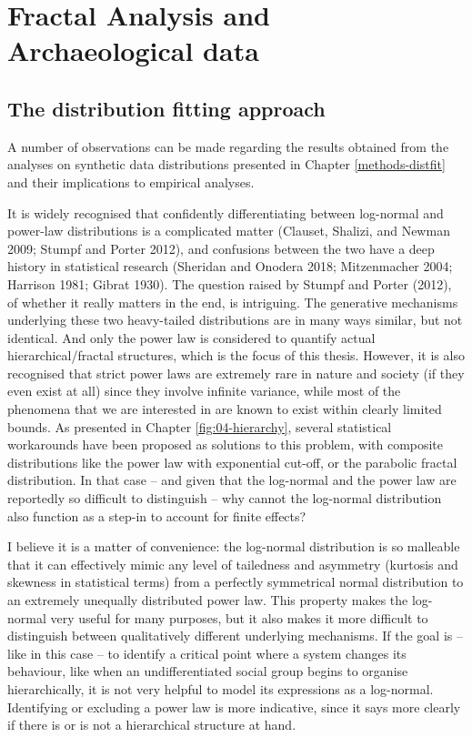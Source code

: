 \documentclass[
  12pt,
  a4paper, twoside]{book}
\begin{document}
\hypertarget{disc-methods}{%
\chapter{Fractal Analysis and Archaeological data}\label{disc-methods}}

\hypertarget{the-distribution-fitting-approach}{%
\section{The distribution fitting approach}\label{the-distribution-fitting-approach}}

A number of observations can be made regarding the results obtained from the analyses on synthetic data distributions presented in Chapter \ref{methods-distfit} and their implications to empirical analyses.

It is widely recognised that confidently differentiating between log-normal and power-law distributions is a complicated matter (Clauset, Shalizi, and Newman 2009; Stumpf and Porter 2012), and confusions between the two have a deep history in statistical research (Sheridan and Onodera 2018; Mitzenmacher 2004; Harrison 1981; Gibrat 1930). The question raised by Stumpf and Porter (2012), of whether it really matters in the end, is intriguing. The generative mechanisms underlying these two heavy-tailed distributions are in many ways similar, but not identical. And only the power law is considered to quantify actual hierarchical/fractal structures, which is the focus of this thesis. However, it is also recognised that strict power laws are extremely rare in nature and society (if they even exist at all) since they involve infinite variance, while most of the phenomena that we are interested in are known to exist within clearly limited bounds. As presented in Chapter \ref{fig:04-hierarchy}, several statistical workarounds have been proposed as solutions to this problem, with composite distributions like the power law with exponential cut-off, or the parabolic fractal distribution. In that case -- and given that the log-normal and the power law are reportedly so difficult to distinguish -- why cannot the log-normal distribution also function as a step-in to account for finite effects?

I believe it is a matter of convenience: the log-normal distribution is so malleable that it can effectively mimic any level of tailedness and asymmetry (kurtosis and skewness in statistical terms) from a perfectly symmetrical normal distribution to an extremely unequally distributed power law. This property makes the log-normal very useful for many purposes, but it also makes it more difficult to distinguish between qualitatively different underlying mechanisms. If the goal is -- like in this case -- to identify a critical point where a system changes its behaviour, like when an undifferentiated social group begins to organise hierarchically, it is not very helpful to model its expressions as a log-normal. Identifying or excluding a power law is more indicative, since it says more clearly if there is or is not a hierarchical structure at hand.
\end{document}
